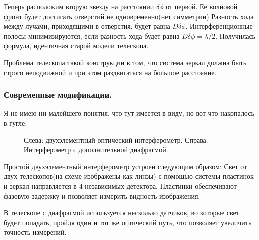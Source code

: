Теперь расположим вторую звезду на расстоянии $\delta\phi$ от первой. Ее волновой фронт будет достигать отверстий не одновременно(нет симметрии) Разность хода между лучами, приходящими в отверстия, будет равна $D\delta\phi$. Интерференционные полосы минимизируются, если разность хода будет равна $D\delta\phi=\lambda/2$. Получилась формула, идентичная старой модели телескопа.

Проблема телескопа такой конструкции в том, что система зеркал  должна быть строго неподвижной и при этом раздвигаться на большое расстояние.
\subsubsection{Современные модификации.}
Я не имею ни малейшего понятия, что тут имеется в виду, но вот что накопалось в гугле:
\begin{figure}[H]
\center{\texttt{[image: 10]}}
\caption{Слева: двухэлементный оптический интерферометр. Справа: Интерферометр с дополнительной диафрагмой.}
\end{figure}
Простой двухэлементный интерферометр устроен следующим образом: Свет от двух телескопов(на схеме изображены как линзы) с помощью системы пластинок и зеркал направляется в 4 независимых детектора. Пластинки обеспечивают фазовую задержку и позволяет измерить видность изображения.
 
В телескопе с диафрагмой используется несколько датчиков, во которые свет будет попадать, пройдя один и тот же оптический путь, что позволяет увеличить точность измерений.